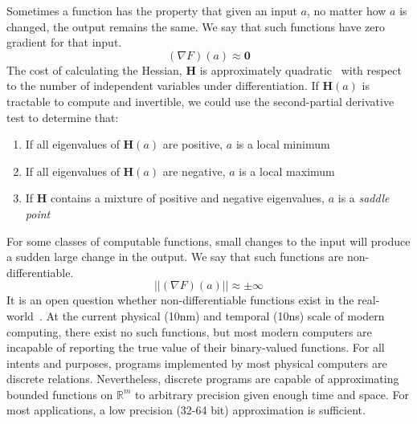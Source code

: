 \noindent Sometimes a function has the property that given an input $a$, no matter how $a$ is changed, the output remains the same. We say that such functions have zero gradient for that input.
%
\begin{equation}
    (\nabla F)(a) \approx \mathbf{0}
\end{equation}
%
The cost of calculating the Hessian, $\mathbf{H}$ is approximately quadratic~\citep{griewank1993some} with respect to the number of independent variables under differentiation. If $\mathbf{H}(a)$ is tractable to compute and invertible, we could use the second-partial derivative test to determine that:\\
%
\begin{enumerate}
    \item If all eigenvalues of $\mathbf{H}(a)$ are positive, $a$ is a local minimum
    \item If all eigenvalues of $\mathbf{H}(a)$ are negative, $a$ is a local maximum
    \item If $\mathbf{H}$ contains a mixture of positive and negative eigenvalues, $a$ is a \textit{saddle point}\\
\end{enumerate}
%
For some classes of computable functions, small changes to the input will produce a sudden large change in the output. We say that such functions are non-differentiable.
%
\begin{equation}
    ||(\nabla F)(a)|| \approx \pm \infty
\end{equation}
%
It is an open question whether non-differentiable functions exist in the real-world~\citep{buniy2005hilbert}. At the current physical (10nm) and temporal (10ns) scale of modern computing, there exist no such functions, but most modern computers are incapable of reporting the true value of their binary-valued functions. For all intents and purposes, programs implemented by most physical computers are discrete relations. Nevertheless, discrete programs are capable of approximating bounded functions on $\mathbb{R}^m$ to arbitrary precision given enough time and space. For most applications, a low precision (32-64 bit) approximation is sufficient.

